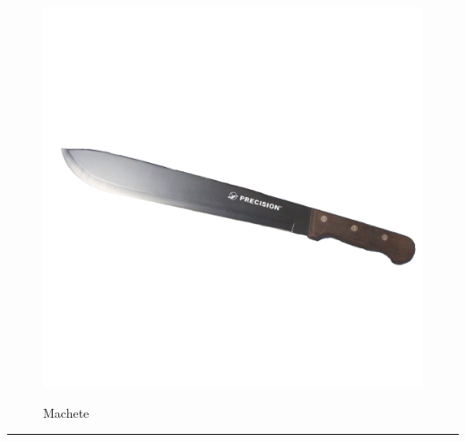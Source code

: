 \documentclass{article}
\begin{document}
    \begin{figure}[H]
        \centering
        \begin{minipage}{0.25\textwidth}
            \centering
            \includegraphics[width=\textwidth]{../SurvivalItemImages/machete}
        \end{minipage}\hfill
        \begin{minipage}{0.7\textwidth}
            \centering
            \Large Machete
        \end{minipage}
    \end{figure}
    \vspace{-0.8em}
    \noindent\rule{\textwidth}{0.4pt}
            
\end{document}

